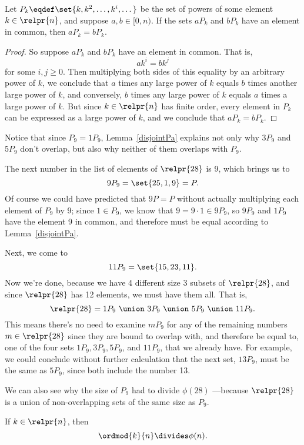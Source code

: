 \begin{lemma}\label{disjointPa}
Let $P_k \eqdef \set{k, k^2, \dots, k^i,\dots}$ be the set of powers
of some element $k \in \relpr{n}$, and suppose $a,b \in [0,n)$.  If
  the sets $aP_k$ and $bP_k$ have an element in common, then $aP_k = bP_k$.

\begin{proof}
So suppose $aP_k$ and $bP_k$ have an element in common.  That is,
\[
ak^i=bk^j
\]
for some $i,j \geq 0$.  Then multiplying both sides of this equality
by an arbitrary power of $k$, we conclude that $a$ times any large power
of $k$ equals $b$ times another large power of $k$, and conversely,
$b$ times any large power of $k$ equals $a$ times a large power of
$k$.  But since $k \in \relpr{n}$ has finite order, every element in
$P_k$ can be expressed as a large power of $k$, and we conclude that
$aP_k = bP_k$.
\end{proof}
\end{lemma}

Notice that since $P_9=1P_9$, Lemma~\ref{disjointPa} explains not only
why $3P_9$ and $5P_9$ don't overlap, but also why neither of them
overlaps with $P_9$.

The next number in the list of elements of $\relpr{28}$ is 9, which
brings us to
\[
9P_9  = \set{25, 1, 9} = P.
\]
Of course we could have predicted that $9P = P$ without actually
multiplying each element of $P_9$ by 9; since $1\in P_9$, we know that
$9 = 9\cdot 1 \in 9P_9$, so $9P_9$ and $1P_9$ have the element 9 in
common, and therefore must be equal according to
Lemma~\ref{disjointPa}.

Next, we come to
\[
11P_9 = \set{15, 23, 11}.
\]
Now we're done, because we have 4 different size 3 subsets of
$\relpr{28}$, and since $\relpr{28}$ has 12 elements, we must
have them all.  That is,
\[
\relpr{28} = 1P_9\ \union\ 3P_9\ \union\ 5P_9\ \union\ 11P_9.
\]
This means there's no need to examine $mP_9$ for any of the remaining
numbers $m \in \relpr{28}$ since they are bound to overlap with, and
therefore be equal to, one of the four sets $1P_9, 3P_9, 5P_9$, and
$11P_9$, that we already have.  For example, we could conclude without
further calculation that the next set, $13P_9$, must be
the same as $5P_9$, since both include the number 13.

We can also see why the size of $P_9$ had to divide $\phi(28)$
---because $\relpr{28}$ is a union of non-overlapping sets of the same
size as $P_9$.

\begin{lemma}\label{orddividesphi}
If $k \in \relpr{n}$, then
\[
\ordmod{k}{n} \divides \phi(n).
\]
\end{lemma}

